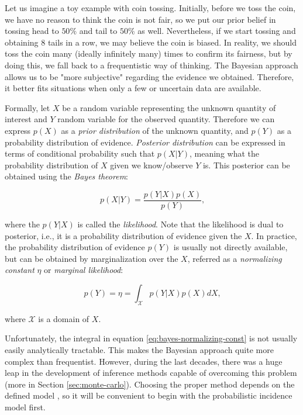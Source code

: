 \documentclass[
  digital, %
  oneside, %
  lof,     %
  lot,     %
]{fithesis4}
\begin{document}
Let us imagine a toy example with coin tossing. 
Initially, before we toss the coin, we have no reason to think the coin is not fair, so we put our prior belief in tossing head to $50\%$ and tail to $50\%$ as well. 
Nevertheless, if we start tossing and obtaining 8 tails in a row, we may believe the coin is biased. 
In reality, we should toss the coin many (ideally infinitely many) times to confirm its fairness, but by doing this, we fall back to a frequentistic way of thinking. 
The Bayesian approach allows us to be "more subjective" regarding the evidence we obtained. 
Therefore, it better fits situations when only a few or uncertain data are available.

Formally, let $X$ be a random variable representing the unknown quantity of interest and $Y$ random variable for the observed quantity.
Therefore we can express $p(X)$ as a \textit{prior distribution} of the unknown quantity, and $p(Y)$ as a probability distribution of evidence.
\textit{Posterior distribution} can be expressed in terms of conditional probability such that $p(X | Y)$, meaning what the probability distribution of $X$ given we know/observe $Y$ is. 
This posterior can be obtained using the \textit{Bayes theorem}:

\begin{equation}\label{eq:bayes-theorem}
p( X | Y ) = \frac{p( Y | X ) p(X)}{p(Y)} \text{,}
\end{equation}

\noindent
where the $p( Y | X )$ is called the \textit{likelihood}.
Note that the likelihood is dual to posterior, i.e., it is a probability distribution of evidence given the $X$.
In practice, the probability distribution of evidence $p(Y)$ is usually not directly available, but can be obtained by marginalization over the $X$, referred as a \textit{normalizing constant} $\eta$ or \textit{marginal likelihood}:

\begin{equation}\label{eq:bayes-normalizing-const}
  p(Y) = \eta = \int_\mathcal{X} p( Y | X ) p(X) dX \text{,}
\end{equation}

\noindent where $\mathcal{X}$ is a domain of $X$.

Unfortunately, the integral in equation \eqref{eq:bayes-normalizing-const} is not usually easily analytically tractable.
This makes the Bayesian approach quite more complex than frequentist.
However, during the last decades, there was a huge leap in the development of inference methods capable of overcoming this problem (more in Section \ref{sec:monte-carlo}). 
Choosing the proper method depends on the defined model \cite{pfeffer2016}, so it will be convenient to begin with the probabilistic incidence model first.
\end{document}
